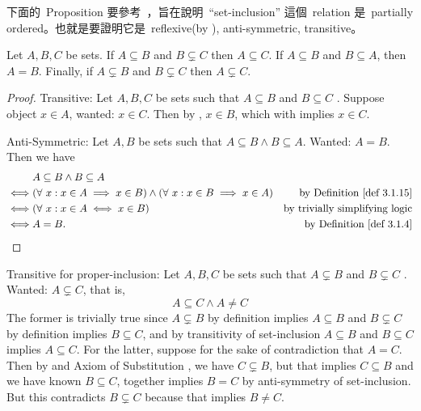\begin{note}
下面的\ Proposition 要參考\ ，旨在說明\ ``set-inclusion'' 這個\ relation 是\ partially ordered。也就是要證明它是\ reflexive(by ), anti-symmetric, transitive。
\end{note}

\begin{proposition}  \label{prop 3.1.18}
Let \(A, B, C\) be sets. If \(A \subseteq B\) and \(B \subsetneq C\) then \(A \subseteq C\). If \(A \subseteq B\) and \(B \subseteq A\), then \(A = B\). Finally, if \(A \subsetneq B\) and \(B \subsetneq C\) then \(A \subsetneq C\).
\end{proposition}

\begin{proof}
Transitive: Let \(A, B, C\) be sets such that \(A \subseteq B\)  and \(B \subseteq C\) . Suppose object \(x \in A\), wanted: \(x \in C\). Then by , \(x \in B\), which with  implies \(x \in C\).

Anti-Symmetric: Let \(A, B\) be sets such that \(A \subseteq B \land B \subseteq A\). Wanted: \(A = B\). Then we have
\begin{align*}
     & A \subseteq B \land B \subseteq A \\
\iff & (\forall\ x : x \in A \implies x \in B) \land (\forall\ x : x \in B \implies x \in A) & \text{by \DEF{3.1.15}} \\
\iff & (\forall\ x : x \in A \iff x \in B) & \text{by trivially simplifying logic} \\
\iff & A = B. & \text{by \DEF{3.1.4}}
\end{align*}
\end{proof}

Transitive for proper-inclusion: Let \(A, B, C\) be sets such that \(A \subsetneq B\)  and \(B \subsetneq C\) . Wanted: \(A \subsetneq C\), that is,
\[
    A \subseteq C \land A \neq C
\] The former is trivially true since \(A \subsetneq B\) by definition implies \(A \subseteq B\) and \(B \subsetneq C\) by definition implies \(B \subseteq C\), and by transitivity of set-inclusion \(A \subseteq B\) and \(B \subseteq C\) implies \(A \subseteq C\). For the latter, suppose for the sake of contradiction that \(A = C\). Then by  and Axiom of Substitution , we have \(C \subsetneq B\), but that implies \(C \subseteq B\) and we have known \(B \subseteq C\), together implies \(B = C\) by anti-symmetry of set-inclusion. But this contradicts \(B \subsetneq C\) because that implies \(B \neq C\).

